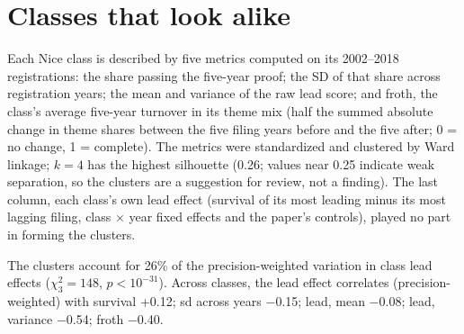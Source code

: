 \section*{Classes that look alike}
Each Nice class is described by five metrics computed on its 2002--2018 registrations: the share passing the five-year proof; the SD of that share across registration years; the mean and variance of the raw lead score; and froth, the class's average five-year turnover in its theme mix (half the summed absolute change in theme shares between the five filing years before and the five after; 0 = no change, 1 = complete). The metrics were standardized and clustered by Ward linkage; $k = 4$ has the highest silhouette (0.26; values near 0.25 indicate weak separation, so the clusters are a suggestion for review, not a finding). The last column, each class's own lead effect (survival of its most leading minus its most lagging filing, class $\times$ year fixed effects and the paper's controls), played no part in forming the clusters.

The clusters account for 26\% of the precision-weighted variation in class lead effects ($\chi^2_{3} = 148$, $p < 10^{-31}$). Across classes, the lead effect correlates (precision-weighted) with survival +0.12; sd across years $-$0.15; lead, mean $-$0.08; lead, variance $-$0.54; froth $-$0.40.

